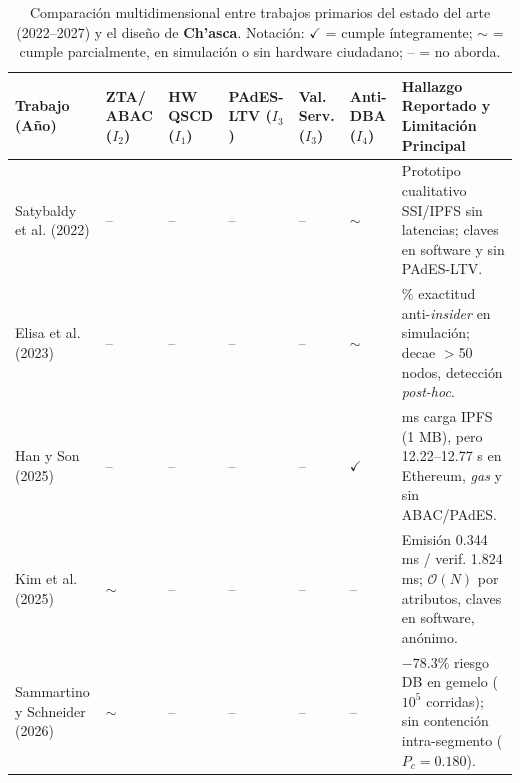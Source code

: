 \documentclass[runningheads,twocolumn]{llncs}
\begin{document}
\begin{table}[t]
\caption{Comparación multidimensional entre trabajos primarios del estado del arte (2022--2027) y el diseño de \textbf{Ch'asca}. Notación: $\checkmark$ = cumple íntegramente; $\sim$ = cumple parcialmente, en simulación o sin hardware ciudadano; -- = no aborda.}
\label{tab:related_comparison}
\scriptsize
\setlength{\tabcolsep}{2.5pt}
\renewcommand{\arraystretch}{1.08}
\begin{tabularx}{\textwidth}{@{}>{\raggedright\arraybackslash}p{2.95cm}>{\centering\arraybackslash}p{1.05cm}>{\centering\arraybackslash}p{1.05cm}>{\centering\arraybackslash}p{1.15cm}>{\centering\arraybackslash}p{1.05cm}>{\centering\arraybackslash}p{1.00cm}>{\raggedright\arraybackslash}X@{}}
\toprule
\textbf{Trabajo (Año)} &
\shortstack{\textbf{ZTA/}\\\textbf{ABAC}\\($I_2$)} &
\shortstack{\textbf{HW}\\\textbf{QSCD}\\($I_1$)} &
\shortstack{\textbf{PAdES-}\\\textbf{LTV}\\($I_3$)} &
\shortstack{\textbf{Val.}\\\textbf{Serv.}\\($I_3$)} &
\shortstack{\textbf{Anti-}\\\textbf{DBA}\\($I_4$)} &
\textbf{Hallazgo Reportado y Limitación Principal} \\
\midrule
Satybaldy et al. \cite{satybaldy2022} (2022) & -- & -- & -- & -- & $\sim$ & Prototipo cualitativo SSI/IPFS sin latencias; claves en software y sin PAdES-LTV. \\
Elisa et al. \cite{elisa2023} (2023) & -- & -- & -- & -- & $\sim$ & 96.52\% exactitud anti-\textit{insider} en simulación; decae $>$50 nodos, detección \textit{post-hoc}. \\
Han y Son \cite{han2025} (2025) & -- & -- & -- & -- & $\checkmark$ & 148 ms carga IPFS (1 MB), pero 12.22--12.77 s en Ethereum, \textit{gas} y sin ABAC/PAdES. \\
Kim et al. \cite{kim2025} (2025) & $\sim$ & -- & -- & -- & -- & Emisión 0.344 ms / verif. 1.824 ms; $\mathcal{O}(N)$ por atributos, claves en software, anónimo. \\
Sammartino y Schneider \cite{sammartino2026} (2026) & $\sim$ & -- & -- & -- & -- & $-78.3\%$ riesgo DB en gemelo ($10^5$ corridas); sin contención intra-segmento ($P_c=0.180$). \\

\end{tabularx}
\end{table}
\end{document}
